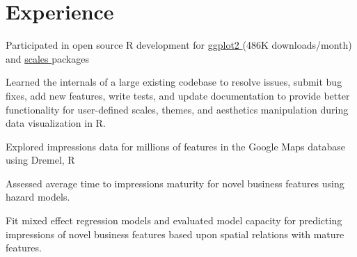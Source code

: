 \documentclass[a4]{deedy-resume-openfont}
\begin{document}
\hfill
\begin{minipage}[t]{0.66\textwidth} 


\section{Experience}

\vspace{\topsep} %
\begin{tightemize}
\item Participated in open source R development for \href{https://github.com/tidyverse/ggplot2}{ggplot2 \faGithub{}} (486K downloads/month) and \href{https://github.com/r-lib/scales}{scales \faGithub} packages
\item Learned the internals of a large existing codebase to resolve issues, submit bug fixes, add new features, write tests, and update documentation to provide better functionality for user-defined scales, themes, and aesthetics manipulation during data visualization in R. 
\end{tightemize}
\sectionsep

\begin{tightemize}
\item Explored impressions data for millions of features in the Google Maps database using Dremel, R
\item Assessed average time to impressions maturity for novel business features using hazard models.
\item Fit mixed effect regression models and evaluated model capacity for predicting impressions of novel business features based upon spatial relations with mature features.
\end{tightemize}
\sectionsep



\end{minipage}
\end{document}

